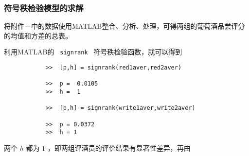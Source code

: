 \documentclass{cumcmart}
\begin{document}
        \subsubsection{符号秩检验模型的求解}
        将附件一中的数据使用MATLAB整合、分析、处理，可得两组的葡萄酒品尝评分的均值和方差的总表。

        利用MATLAB的 \verb| signrank | 符号秩检验函数，就可以得到
        \begin{verbatim}
            >>  [p,h] = signrank(red1aver,red2aver)

            >>  p =  0.0105
            >>  h =  1

            >>  [p,h] = signrank(write1aver,write2aver)

            >>  p = 0.0372
            >>  h = 1

        \end{verbatim}

        两个 $h$ 都为 $1$ ，即两组评酒员的评价结果有显著性差异，再由
\end{document}
